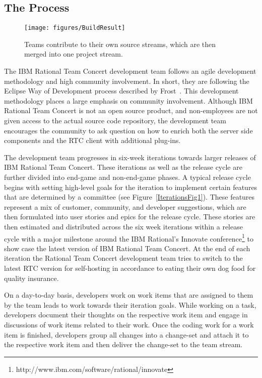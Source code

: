 \subsection{The Process}
\begin{figure}[t]
\begin{center}
\texttt{[image: figures/BuildResult]}
\caption{Teams contribute to their own source streams, which are then merged into one project stream.}
\vspace{-10pt}
\label{fig:buildresult1}
\end{center}
\end{figure}



The IBM Rational Team Concert development team follows an agile development methodology and high community involvement.
In short, they are following the Eclipse Way of Development process described by Frost~\cite{frost:ieeesoftware:2007}.
This development methodology places a large emphasis on community involvement.
Although IBM Rational Team Concert is not an open source product, and non-employees are not given access to the actual source code repository, the development team encourages the community to ask question on how to enrich both the server side components and the RTC client with additional plug-ins.

The development team progresses in six-week iterations towards larger releases of IBM Rational Team Concert.
These iterations as well as the release cycle are further divided into end-game and non-end-game phases.
A typical release cycle begins with setting high-level goals for the iteration to implement certain features that are determined by a committee (see Figure~\ref{IterationsFig1}).
These features represent a mix of customer, community, and developer suggestions, which are then formulated into user stories and epics for the release cycle.
These stories are then estimated and distributed across the six week iterations within a release cycle with a major milestone around the IBM Rational's Innovate conference\footnote{http://www.ibm.com/software/rational/innovate} to show case the latest version of IBM Rational Team Concert. 
At the end of each iteration the Rational Team Concert development team tries to switch to the latest RTC version for self-hosting in accordance to eating their own dog food for quality insurance.

On a day-to-day basis, developers work on work items that are assigned to them by the team leads to work towards their iteration goals.
While working on a task, developers document their thoughts on the respective work item and engage in discussions of work items related to their work.
Once the coding work for a work item is finished, developers group all changes into a change-set and attach it to the respective work item and then deliver the change-set to the team stream.


